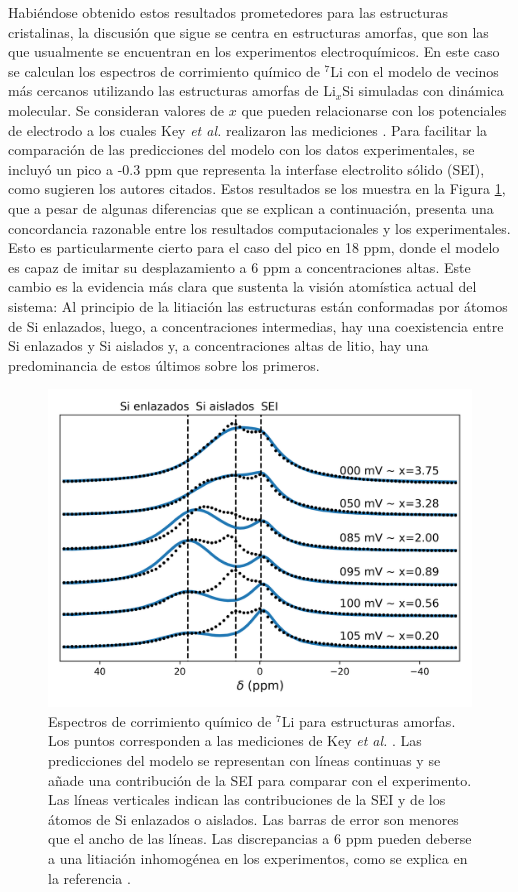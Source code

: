 Habiéndose obtenido estos resultados prometedores para las estructuras cristalinas,
la discusión que sigue se centra en estructuras amorfas, que son las que 
usualmente se encuentran en los experimentos electroquímicos. En este caso se 
calculan los espectros de corrimiento químico de $^7$Li con el modelo de vecinos 
más cercanos utilizando las estructuras amorfas de Li$_x$Si simuladas con 
dinámica molecular. Se consideran valores de $x$ que pueden relacionarse con los 
potenciales de electrodo a los cuales Key \textit{et al.} realizaron las mediciones 
\cite{key2009}. Para facilitar la comparación de las predicciones del modelo con 
los datos experimentales, se incluyó un pico a -0.3 ppm que representa la 
interfase electrolito sólido (SEI), como sugieren los autores citados. Estos 
resultados se los muestra en la Figura \ref{fig:a-nmr}, que a pesar de algunas 
diferencias que se explican a continuación, presenta una concordancia razonable
entre los resultados computacionales y los experimentales.
Esto es particularmente cierto para el caso del pico en 18 ppm, donde el modelo 
es capaz de imitar su desplazamiento a 6 ppm a concentraciones altas. Este cambio
es la evidencia más clara que sustenta la visión atomística actual del sistema: 
Al principio de la litiación las estructuras están conformadas por átomos de Si 
enlazados, luego, a concentraciones intermedias, hay una coexistencia entre Si 
enlazados y Si aislados y, a concentraciones altas de litio, hay una predominancia
de estos últimos sobre los primeros.
\begin{figure}[h!]
    \centering
    \includegraphics[width=.7\textwidth]{Silicio/prediccion/resultados/nmr/a-nmr.png}
    \caption{Espectros de corrimiento químico de $^7$Li para estructuras amorfas.
    Los puntos corresponden a las mediciones de Key \textit{et al.} \cite{key2009}. Las
    predicciones del modelo se representan con líneas continuas y se añade una 
    contribución de la SEI para comparar con el experimento. Las líneas verticales 
    indican las contribuciones de la SEI y de los átomos de Si enlazados o 
    aislados. Las barras de error son menores que el ancho de las líneas. Las 
    discrepancias a 6 ppm pueden deberse a una litiación inhomogénea en los 
    experimentos, como se explica en la referencia \cite{key2009}.} 
    \label{fig:a-nmr}
\end{figure}

